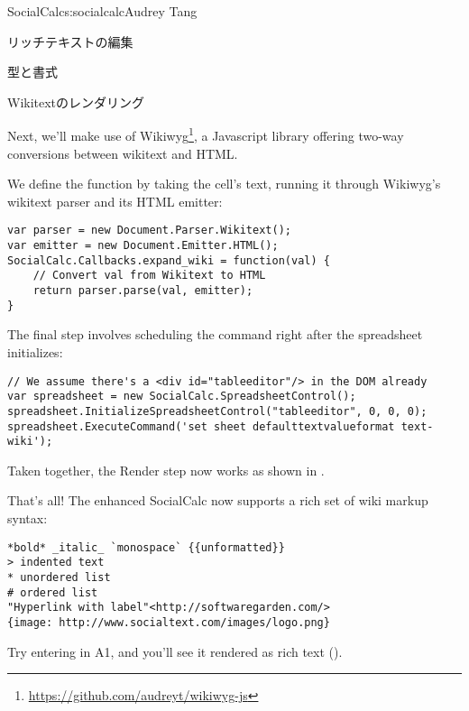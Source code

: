 \begin{aosachapter}{SocialCalc}{s:socialcalc}{Audrey Tang}
\begin{aosasect1}{リッチテキストの編集}
\begin{aosasect2}{型と書式}
\end{aosasect2}

\begin{aosasect2}{Wikitextのレンダリング}

Next, we'll make use of
Wikiwyg\footnote{\url{https://github.com/audreyt/wikiwyg-js}}, a
Javascript library offering two-way conversions between wikitext and
HTML.

We define the  function by taking the cell's text,
running it through Wikiwyg's wikitext parser and its HTML emitter:

\begin{verbatim}
var parser = new Document.Parser.Wikitext();
var emitter = new Document.Emitter.HTML();
SocialCalc.Callbacks.expand_wiki = function(val) {
    // Convert val from Wikitext to HTML
    return parser.parse(val, emitter);
}
\end{verbatim}

\pagebreak 
\noindent The final step involves scheduling the  command right after the
spreadsheet initializes:


\begin{verbatim}
// We assume there's a <div id="tableeditor"/> in the DOM already
var spreadsheet = new SocialCalc.SpreadsheetControl();
spreadsheet.InitializeSpreadsheetControl("tableeditor", 0, 0, 0);
spreadsheet.ExecuteCommand('set sheet defaulttextvalueformat text-wiki');
\end{verbatim}

\noindent Taken together, the Render step now works as shown in
.


That's all!  The enhanced SocialCalc now supports a rich set of wiki
markup syntax:

\begin{verbatim}
*bold* _italic_ `monospace` {{unformatted}}
> indented text
* unordered list
# ordered list
"Hyperlink with label"<http://softwaregarden.com/>
{image: http://www.socialtext.com/images/logo.png}
\end{verbatim}

\noindent Try entering  in A1, and you'll
see it rendered as rich text ().


\end{aosasect2}
\end{aosasect1}
\end{aosachapter}

